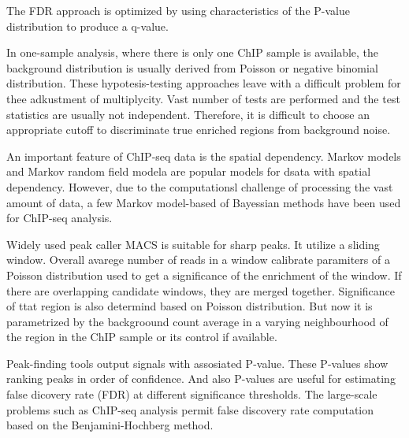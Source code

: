 The FDR approach is optimized by using characteristics of the P-value distribution to produce a q-value.


In one-sample analysis, where there is only one ChIP sample is available, the background distribution is usually derived from Poisson or negative binomial distribution.
These hypotesis-testing approaches leave with a difficult problem for thee adkustment of multiplycity.
Vast number of tests are performed and the test statistics are usually not independent.
Therefore, it is difficult to choose an appropriate cutoff to discriminate true enriched regions from background noise.

An important feature of ChIP-seq data is the spatial dependency.
Markov models and Markov random field modela are popular models for dsata with spatial dependency.
However, due to the computationsl challenge of processing the vast amount of data, a few Markov model-based of Bayessian methods have been used for ChIP-seq analysis.



Widely used peak caller MACS is suitable for sharp peaks.
It utilize a sliding window. 
Overall avarege number of reads in a window calibrate paramiters of a Poisson distribution used to get a significance of the enrichment of the window.
If there are overlapping candidate windows, they are merged together.
Significance of ttat region is also determind based on Poisson distribution.
But now it is parametrized by the backgroound count average in a varying neighbourhood of the region in the ChIP sample or its control if available.







Peak-finding tools output signals with assosiated P-value.
These P-values show ranking peaks in order of confidence.
And also P-values are useful for estimating false dicovery rate (FDR) at different significance thresholds.
% 
The large-scale problems such as ChIP-seq analysis permit false discovery rate computation based on the Benjamini-Hochberg method.

